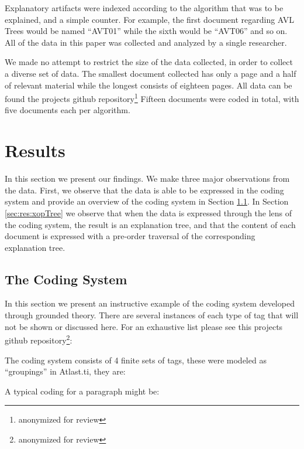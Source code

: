 \documentclass[sigconf]{acmart}
\begin{document}
Explanatory artifacts were indexed according to the algorithm that was to be
explained, and a simple counter. For example, the first document regarding AVL
Trees would be named ``AVT01'' while the sixth would be ``AVT06'' and so on.
All of the data in this paper was collected and analyzed by a single researcher.

We made no attempt to restrict the size of the data collected, in order to
collect a diverse set of data. The smallest document collected has only a page
and a half of relevant material while the longest consists of eighteen pages.
All data can be found the projects github repository\footnote[1]{anonymized for
  review} Fifteen documents were coded in total, with five documents each per
algorithm.

\section{Results}
In this section we present our findings. We make three major observations from
the data. First, we observe that the data is able to be expressed in the coding
system and provide an overview of the coding system in Section
\ref{sec:res:sys}. In Section \ref{sec:res:xopTree} we observe that when the
data is expressed through the lens of the coding system, the result is an
explanation tree, and that the content of each document is expressed with a
pre-order traversal of the corresponding explanation tree. 

\subsection{The Coding System}
\label{sec:res:sys}

In this section we present an instructive example of the coding system developed
through grounded theory. There are several instances of each type of tag that
will not be shown or discussed here. For an exhaustive list please see this
projects github repository\footnote{anonymized for review}:


The coding system consists of 4 finite sets of tags, these were modeled as
``groupings'' in Atlast.ti, they are: 


A typical coding for a paragraph might be:
\newline
\newline
{}
\newline
\newline
{}
\end{document}

